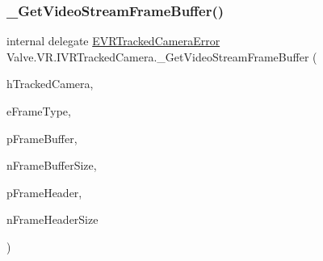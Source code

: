 \mbox{\label{struct_valve_1_1_v_r_1_1_i_v_r_tracked_camera_afdef1fed34343a2452be09cbe044d9ed}} 
\subsubsection{\texorpdfstring{\_GetVideoStreamFrameBuffer()}{\_GetVideoStreamFrameBuffer()}}
{\footnotesize\ttfamily internal delegate \mbox{\hyperlink{namespace_valve_1_1_v_r_ad0e012e846f5d93848783c044614cfd3}{E\+V\+R\+Tracked\+Camera\+Error}} Valve.\+V\+R.\+I\+V\+R\+Tracked\+Camera.\+\_\+\+Get\+Video\+Stream\+Frame\+Buffer (\begin{DoxyParamCaption}\item[{ulong}]{h\+Tracked\+Camera,  }\item[{\mbox{\hyperlink{namespace_valve_1_1_v_r_a9962211bc3fe98c2683db188c12c9afd}{E\+V\+R\+Tracked\+Camera\+Frame\+Type}}}]{e\+Frame\+Type,  }\item[{Int\+Ptr}]{p\+Frame\+Buffer,  }\item[{uint}]{n\+Frame\+Buffer\+Size,  }\item[{ref \mbox{\hyperlink{struct_valve_1_1_v_r_1_1_camera_video_stream_frame_header__t}{Camera\+Video\+Stream\+Frame\+Header\+\_\+t}}}]{p\+Frame\+Header,  }\item[{uint}]{n\+Frame\+Header\+Size }\end{DoxyParamCaption})}

\mbox{\label{struct_valve_1_1_v_r_1_1_i_v_r_tracked_camera_a3b47cba3117a77b9f31e6e58ceb9936e}} 
